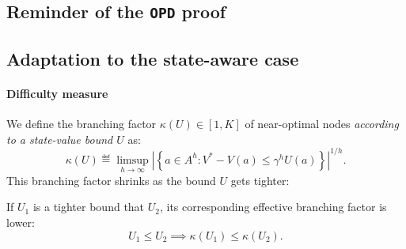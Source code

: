 \documentclass{article}
\begin{document}
\subsection{Reminder of the \texttt{OPD} proof}

\noindent{}
\subsection{Adaptation to the state-aware case}
\paragraph{Difficulty measure}

We define the branching factor $\kappa(U)\in[1, K]$ of near-optimal nodes \emph{according to a state-value bound $U$} as:
\begin{equation}
    \kappa(U) \eqdef \limsup_{h\rightarrow\infty} \left|\left\{a\in A^h: V^* - V(a)\leq \gamma^{h}U(a)\right\}\right|^{1/h}.
\end{equation}
This branching factor shrinks as the bound $U$ gets tighter:
\begin{lemma}
If $U_1$ is a tighter bound that $U_2$, its corresponding effective branching factor is lower:
\[U_1\leq U_2\implies \kappa(U_1) \leq \kappa(U_2).\]
\end{lemma}
\end{document}

